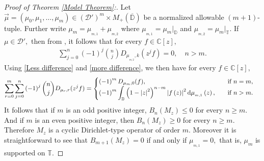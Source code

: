 \documentclass[10pt,oneside,reqno]{amsart}
\theoremstyle{definition}
\theoremstyle{remark}
\newcommand{\abs}[1]{\left\lvert #1 \right\rvert}
\newcommand{\D}{\mathbb D}
\newcommand{\T}{\mathbb T}
\numberwithin{equation}{section}
\begin{document}
\begin{proof}[Proof of Theorem \ref{Model Theorem}:]
    Let $\overrightarrow{\mu}= (\mu_0,\mu_1,\ldots,\mu_{m})\in (\mathcal D')^{m}\times M_+(\overline{\D})$ be a normalized allowable $(m+1)$-tuple. Further write $\mu_m=\mu_{_{m,1}}+\mu_{_{m,2}}$ where $\mu_{_{m,1}} = {\mu_m} |_{\D}$ and $\mu_{_{m,2}} = {\mu_m} |_{\T}$. If $\mu\in \mathcal D',$ then from \cite[Proposition 3.4]{Rydhe19}, it follows that for every $f\in\mathbb C[z],$
    \begin{align}\label{difference higher order}
        \sum_{j=0}^{n} \left( -1 \right)^{j} \binom{n}{j} D_{\mu_{_{m,2}},k}(z^{j}f)= 0,\quad n> m.
    \end{align}
Using \eqref{Less difference} and \eqref{more difference}, we then have for every $f\in\mathbb C[z],$
\begin{align*}
        \sum\limits_{r=0}^{m}\sum_{j=0}^{n} \left( -1 \right)^{j} \binom{n}{j} D_{\mu_r,r}(z^{j}f) &= 
        \begin{cases}
         \left( -1 \right)^{m}  D_{\mu_m,0}(f) , & \quad \mbox{if\,\,} n=m,\\
        \left( -1 \right)^{m} \displaystyle \int_{\D} \left( 1-\abs{z}^{2} \right)^{n-m} \abs{f\left( z \right)}^{2} \mathrm{d}{\mu_{_{m,1}}} \left( z \right), &\quad \mbox{if\,\,} n > m.
        \end{cases} 
    \end{align*}
    It follows that if $m$ is an odd positive integer, $B_n(M_z)\leqslant 0$ for every $n\geqslant m.$ And if $m$ is an even positive integer, then $B_n(M_z)\geqslant 0$ for every $n\geqslant m.$ Therefore $M_z$ is a cyclic Dirichlet-type operator of order $m.$ Moreover it is straightforward to see that $B_{m+1}(M_z)=0$ if and only if $\mu_{_{m,1}}=0,$ that is, $\mu_m$ is supported on $\mathbb T.$


\end{proof}
\end{document}
